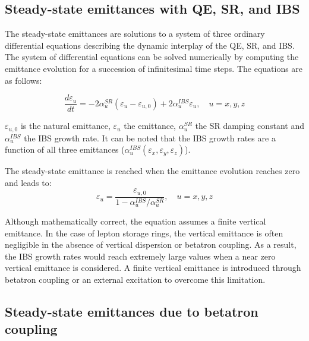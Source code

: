 \subsection{Steady-state emittances with QE, SR, and IBS}

The steady-state emittances are solutions to a system of three ordinary differential equations describing the dynamic interplay of the QE, SR, and IBS. The system of differential equations can be solved numerically by computing the emittance evolution for a succession of infinitesimal time steps. The equations are as follows:


\begin{equation}
    \frac{d\varepsilon_u}{dt} = -2 \alpha^{SR}_u \left(\varepsilon_u - \varepsilon_{u,0} \right) + 2\alpha^{IBS}_u \varepsilon_{u}, \quad u = x,y,z
\label{eq:emit_evol}
\end{equation}

$\varepsilon_{u,0}$ is the natural emittance, $\varepsilon_u$ the emittance, $\alpha^{SR}_u$ the SR damping constant and $\alpha^{IBS}_u$ the IBS growth rate.
It can be noted that the IBS growth rates are a function of all three emittances ($\alpha^{IBS}_u(\varepsilon_{x}, \varepsilon_{y}, \varepsilon_{z})$).

The steady-state emittance is reached when the emittance evolution reaches zero and leads to:
\begin{equation}
    \varepsilon_u = \frac{\varepsilon_{u,0}}{1 - \alpha^{IBS}_u / \alpha^{SR}_u}, \quad u = x,y,z
\label{eq:emit_final}
\end{equation}

Although mathematically correct, the equation assumes a finite vertical emittance. In the case of lepton storage rings, the vertical emittance is often negligible in the absence of vertical dispersion or betatron coupling. As a result, the IBS growth rates would reach extremely large values when a near zero vertical emittance is considered. A finite vertical emittance is introduced through betatron coupling or an external excitation to overcome this limitation.

\subsection{Steady-state emittances due to betatron coupling}

